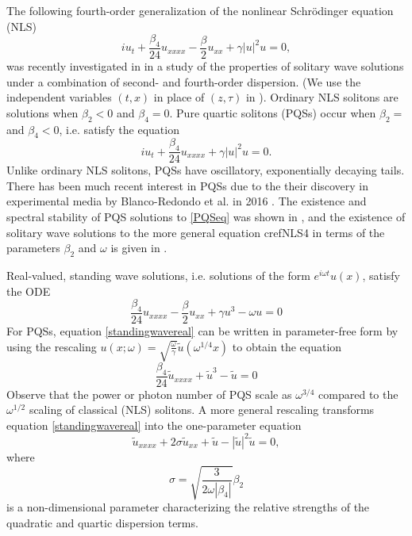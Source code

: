 \documentclass[12pt]{article}
\begin{document}
The following fourth-order generalization of the nonlinear Schr{\"o}dinger equation (NLS)
\begin{equation}\label{NLS4}
i u_t + \frac{\beta_4}{24}u_{xxxx} - \frac{\beta}{2}u_{xx} + \gamma |u|^2 u = 0,
\end{equation}
was recently investigated in \cite{Tam2020} in a study of the properties of solitary wave solutions under a combination of second- and fourth-order dispersion. (We use the independent variables $(t, x)$ in place of $(z, \tau)$ in \cite{Tam2020}). Ordinary NLS solitons are solutions when $\beta_2 < 0$ and $\beta_4 = 0$. Pure quartic solitons (PQSs) occur when $\beta_2 = $ and $\beta_4 < 0$, i.e. satisfy the equation
\begin{equation}\label{PQSeq}
i u_t + \frac{\beta_4}{24}u_{xxxx} + \gamma |u|^2 u = 0.
\end{equation}
Unlike ordinary NLS solitons, PQSs have oscillatory, exponentially decaying tails. There has been much recent interest in PQSs due to the their discovery in experimental media by Blanco-Redondo et al. in 2016 \cite{BlancoPQS}. The existence and spectral stability of PQS solutions to \cref{PQSeq} was shown in \cite{Tam2019}, and the existence of solitary wave solutions to the more general equation cref{NLS4} in terms of the parameters $\beta_2$ and $\omega$ is given in \cite{Tam2020}.

Real-valued, standing wave solutions, i.e. solutions of the form $e^{i \omega t} u(x)$, satisfy the ODE 
\begin{equation}\label{standingwavereal}
\frac{\beta_4}{24}u_{xxxx} - \frac{\beta}{2}u_{xx} + \gamma u^3 - \omega u = 0
\end{equation}
For PQSs, equation \cref{standingwavereal} can be written in parameter-free form by using the rescaling $u(x; \omega) = \sqrt{\frac{\omega}{\gamma}}\tilde{u}(\omega^{1/4}x)$ to obtain the equation
\begin{equation}\label{PQSparfree}
\frac{\beta_4}{24}\tilde{u}_{xxxx} + \tilde{u}^3 - \tilde{u} = 0
\end{equation}
Observe that the power or photon number of PQS scale as $\omega^{3/4}$ compared to the $\omega^{1/2}$ scaling of classical (NLS) solitons. A more general rescaling \cite[Section VI]{Tam2020} transforms equation \cref{standingwavereal} into the one-parameter equation
\begin{equation}\label{NLS4onepar}
\tilde{u}_{xxxx} + 2 \sigma \tilde{u}_{xx} +  \tilde{u} - |\tilde{u}|^2 \tilde{u} = 0,
\end{equation}
where 
\[
\sigma = \sqrt{\frac{3}{2 \omega |\beta_4| }}\beta_2
\]
is a non-dimensional parameter characterizing the relative strengths of the quadratic and quartic dispersion terms.
\end{document}
